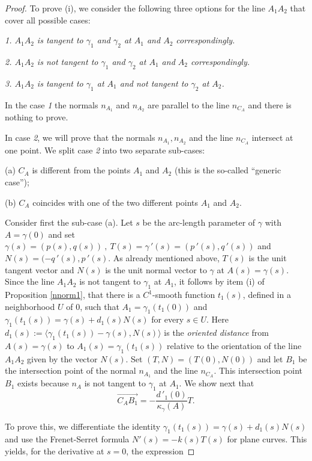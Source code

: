 \documentclass[a4paper,12pt]{amsart}
\def\g{\gamma}
\begin{document}
\begin{proof}To prove (i), we consider the following three options for the line $A_1A_2$ that cover all possible cases:

\emph{1. $A_1A_2$ is tangent to $\g_1$ and  $\g_2$
at $A_1$ and  $A_2$ correspondingly.}

\emph{2. $A_1A_2$ is not tangent to $\g_1$ and
$\g_2$ at $A_1$ and $A_2$ correspondingly. }

\emph{3. $A_1A_2$ is tangent to $\g_1$ at $A_1$ and not tangent to $\g_2$ at $A_2$. }

In the case \emph{1} the normals $n_{A_1}$ and $n_{A_2}$ are parallel to
the line $n_{C_A}$ and there is nothing to prove.

In case \emph{2}, we will prove that the normals
$n_{A_1} , n_{A_2}$
and the line $n_{C_A}$ intersect at one point.
We split case \emph{2} into two separate sub-cases:

(a) $C_A$ is different from the points $A_1$ and $A_2 $ (this is the so-called ``generic case'');

(b) $C_A$ coincides with one of the two different points $A_1$ and $A_2$.

Consider first the sub-case (a).
Let $s$ be the arc-length parameter of $\g$ with $A=\g(0)$
and set $\g(s)=(p(s), q(s)) \ , \ T(s)=\g\,'(s)=(p\,'(s),q\,'(s))$ and
$N(s)= (-q\,'(s), p\,'(s)$. As already mentioned above,  $T(s)$ is the unit tangent vector
and $N(s)$ is the unit normal vector to $\g$ at $A(s)=\g(s)$. Since the line $A_1A_2$ is not tangent to $\g_1$ at $A_1$, it
follows by item (i) of Proposition \ref{nnorm1}, that there is  a
$C^1$-smooth function $t_1(s)$, defined in a neighborhood $U$ of $0$, such that $A_1= \g_1(t_1(0))$ and
$\g_1(t_1(s))= \g(s)+ d_1(s)N(s)$ for every $s \in U$.
Here
$d_1(s):= \langle \g_1(t_1(s)) - \g(s), N(s)\rangle$ is
the {\it oriented distance} from $A(s)=\g(s)$ to $A_1(s)=\g_1(t_1(s))$ relative to the orientation
of the line $A_1A_2$ given by the vector $N(s)$. Set
$(T,N)=(T(0),N(0))$ and let $B_1$ be the intersection point of the
normal $n_{A_1}$ and the line $n_{C_A}$. This intersection point $B_1$ exists because $n_A$ is not tangent to $\g_1$ at $A_1$. We show next that
\begin{equation}\label{D1}
\overrightarrow{C_AB_1} =-\frac{d\,'_1(0)}{\kappa_{\g}(A)}T .
\end{equation}

To prove this, we differentiate the identity
$\g_1(t_1(s))= \g(s)+ d_1(s)N(s)$ and use the Frenet-Serret formula $N'(s)= -k(s)T(s)$ for plane
curves. This yields,  for the derivative at $s=0$, the expression


\end{proof}
\end{document}
